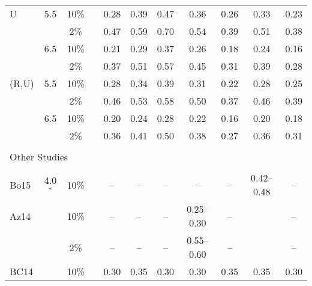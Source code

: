 \begin{table*}[t]
\begin{tabular}{lcccccccccc}
    U       &   5.5 &  10\%  &&   0.28      &   0.39      &   0.47      &   0.36      &   0.26      &   0.33      &   0.23      \\
            &       &   2\%  &&   0.47      &   0.59      &   0.70      &   0.54      &   0.39      &   0.51      &   0.38      \\
            &   6.5 &  10\%  &&   0.21      &   0.29      &   0.37      &   0.26      &   0.18      &   0.24      &   0.16      \\
            &       &   2\%  &&   0.37      &   0.51      &   0.57      &   0.45      &   0.31      &   0.39      &   0.28      \\
    (R,U)   &   5.5 &  10\%  &&   0.28      &   0.34      &   0.39      &   0.31      &   0.22      &   0.28      &   0.25      \\
            &       &   2\%  &&   0.46      &   0.53      &   0.58      &   0.50      &   0.37      &   0.46      &   0.39      \\
            &   6.5 &  10\%  &&   0.20      &   0.24      &   0.28      &   0.22      &   0.16      &   0.20      &   0.18      \\
            &       &   2\%  &&   0.36      &   0.41      &   0.50      &   0.38      &   0.27      &   0.36      &   0.31      \\[0.6ex]
    \hline                                                                                                                      \\[-1.6ex]
    \multicolumn{3}{l}{Other Studies}                                                                                           \\[0.6ex]
    \cline{1-3} \cline{5-11}                                                                                                    \\[-1.6ex]
    Bo15    &   4.0${}^{*}$ 
                    &  10\%  &&   --        &   --        &   --        &   --        &   --        & 0.42--0.48  &   --        \\
    Az14    &       &  10\%  &&   --        &   --        &   --        & 0.25--0.30  &   --        &             &   --        \\
            &       &   2\%  &&   --        &   --        &   --        & 0.55--0.60  &   --        &             &   --        \\
    BC14    &       &  10\%  &&   0.30      &   0.35      &   0.30      &   0.30      &   0.35      &   0.35      &   0.30      \\

\end{tabular}
\end{table*}
